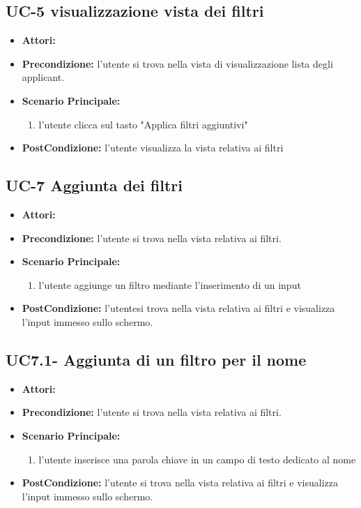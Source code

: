 \subsection{UC-5 visualizzazione vista dei filtri}
\begin{itemize}
\item \textbf{Attori:}\loggedusr
\item \textbf{Precondizione:} l'utente si trova nella vista di visualizzazione lista degli applicant.
\item \textbf{Scenario Principale:}
\begin{enumerate}
	\item l'utente clicca sul tasto "Applica filtri aggiuntivi"
\end{enumerate}
\item \textbf{PostCondizione:} l'utente visualizza la vista relativa ai filtri
\end{itemize}

\subsection{UC-7 Aggiunta dei filtri}
\begin{itemize}
\item \textbf{Attori:}\loggedusr
\item \textbf{Precondizione:} l'utente si trova nella vista relativa ai filtri.
\item \textbf{Scenario Principale:}
\begin{enumerate}
	\item l'utente aggiunge un filtro mediante l'inserimento di un input
\end{enumerate}
\item \textbf{PostCondizione:} l'utentesi trova nella vista relativa ai filtri e visualizza l'input immesso sullo schermo.
\end{itemize}

\subsection{UC7.1- Aggiunta di un filtro per il nome}
\begin{itemize}
\item \textbf{Attori:}\loggedusr
\item \textbf{Precondizione:} l'utente si trova nella vista relativa ai filtri.
\item \textbf{Scenario Principale:}
\begin{enumerate}
	\item l'utente inserisce una parola chiave in un campo di testo dedicato al nome
\end{enumerate}
\item \textbf{PostCondizione:}  l'utente si trova nella vista relativa ai filtri e visualizza l'input immesso sullo schermo.
\end{itemize}

